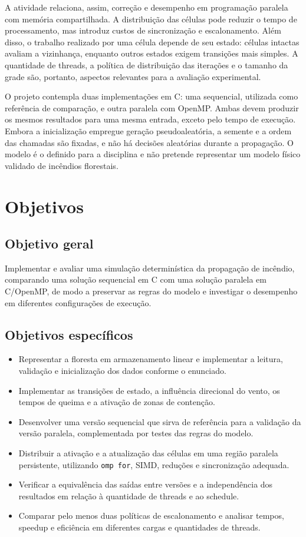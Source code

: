 \documentclass[12pt,a4paper]{article}
\begin{document}
A atividade relaciona, assim, correção e desempenho em programação paralela
com memória compartilhada. A distribuição das células pode reduzir o tempo
de processamento, mas introduz custos de sincronização e escalonamento.
Além disso, o trabalho realizado por uma célula depende de seu estado:
células intactas avaliam a vizinhança, enquanto outros estados exigem
transições mais simples. A quantidade de threads, a política de distribuição
das iterações e o tamanho da grade são, portanto, aspectos relevantes para
a avaliação experimental.

O projeto contempla duas implementações em C: uma sequencial, utilizada
como referência de comparação, e outra paralela com OpenMP. Ambas devem
produzir os mesmos resultados para uma mesma entrada, exceto pelo tempo de
execução. Embora a inicialização empregue geração pseudoaleatória, a
semente e a ordem das chamadas são fixadas, e não há decisões aleatórias
durante a propagação. O modelo é o definido para a disciplina e não pretende
representar um modelo físico validado de incêndios florestais.

\section{Objetivos}

\subsection{Objetivo geral}

Implementar e avaliar uma simulação determinística da propagação de incêndio,
comparando uma solução sequencial em C com uma solução paralela em C/OpenMP,
de modo a preservar as regras do modelo e investigar o desempenho em
diferentes configurações de execução.

\subsection{Objetivos específicos}

\begin{itemize}
\item Representar a floresta em armazenamento linear e implementar a leitura,
validação e inicialização dos dados conforme o enunciado.
\item Implementar as transições de estado, a influência direcional do vento,
os tempos de queima e a ativação de zonas de contenção.
\item Desenvolver uma versão sequencial que sirva de referência para a
validação da versão paralela, complementada por testes das regras do modelo.
\item Distribuir a ativação e a atualização das células em uma região
paralela persistente, utilizando \texttt{omp for}, SIMD, reduções e
sincronização adequada.
\item Verificar a equivalência das saídas entre versões e a independência
dos resultados em relação à quantidade de threads e ao schedule.
\item Comparar pelo menos duas políticas de escalonamento e analisar tempos,
speedup e eficiência em diferentes cargas e quantidades de threads.
\end{itemize}
\end{document}

